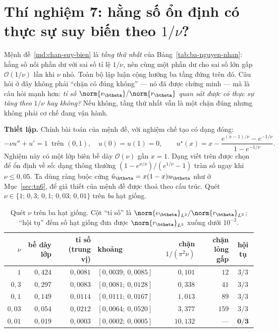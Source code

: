 \section{Thí nghiệm 7: hằng số ổn định có thực sự suy biến theo $1/\nu$?}
\label{sec:tn7}

\begin{thinghiem}
\label{tn:nu}
Mệnh đề~\ref{md:chan-suy-bien} là \emph{tầng thứ nhất} của
Bảng~\ref{tab:ba-nguyen-nhan}: hằng số nối phần dư với sai số tỉ lệ $1/\nu$, nên
cùng một phần dư cho sai số lớn gấp $\mathcal{O}(1/\nu)$ lần khi $\nu$ nhỏ. Toàn
bộ lập luận cộng hưởng ba tầng đứng trên đó. Câu hỏi ở đây không phải ``chặn có
đúng không'' --- nó đã được chứng minh --- mà là câu hỏi mạnh hơn:
\emph{tỉ số $\norm{e_{\btheta}}/\norm{r_{\btheta}}$ quan sát được có thực sự tăng
theo $1/\nu$ hay không?} Nếu không, tầng thứ nhất vẫn là một chặn đúng nhưng
không phải cơ chế đang vận hành.
\end{thinghiem}

\textbf{Thiết lập.} Chính bài toán của mệnh đề, với nghiệm chế tạo có dạng đóng:
\begin{equation}
-\nu u'' + u' = 1 \ \text{ trên } (0,1), \quad u(0)=u(1)=0,
\qquad
u^{\star}(x) = x - \frac{e^{(x-1)/\nu} - e^{-1/\nu}}{1 - e^{-1/\nu}} .
\label{eq:tn7-nghiem}
\end{equation}
Nghiệm này có một lớp biên bề dày $\mathcal{O}(\nu)$ gần $x=1$. Dạng viết trên
được chọn để ổn định về số: dạng thông thường $(1-e^{x/\nu})/(e^{1/\nu}-1)$ tràn
số ngay khi $\nu \le 0{,}05$. Ta dùng ràng buộc cứng
$\hat u_{\btheta} = x(1-x)u_{\btheta}$ như ở Mục~\ref{sec:tn6}, để giả thiết của
mệnh đề được thoả theo cấu trúc. Quét $\nu \in \{1;\,0{,}3;\,0{,}1;\,0{,}03;\,
0{,}01\}$ trên \emph{ba} hạt giống.

\begin{table}[H]
\centering
\caption[Quét $\nu$ cho bài toán đối lưu--khuếch tán]{Quét $\nu$ trên ba hạt
giống. Cột ``tỉ số'' là $\norm{e_{\btheta}}_{L^2}/\norm{r_{\btheta}}_{L^2}$;
``hội tụ'' đếm số hạt giống đưa được $\norm{r_{\btheta}}_{L^2}$ xuống dưới
$10^{-2}$.}
\label{tab:tn7}
\small
\setlength{\tabcolsep}{4pt}
\begin{tabular}{@{}r r r l r r c@{}}
\toprule
$\nu$ & bề dày lớp & tỉ số (trung vị) & khoảng & chặn $1/(\pi^2\nu)$
& chặn lỏng gấp & hội tụ \\
\midrule
$1$      & $0{,}424$ & $0{,}0081$ & $[0{,}0039;\ 0{,}0085]$ & $0{,}101$ & $12$  & $3/3$ \\
$0{,}3$  & $0{,}297$ & $0{,}0083$ & $[0{,}0081;\ 0{,}0128]$ & $0{,}338$ & $41$  & $3/3$ \\
$0{,}1$  & $0{,}149$ & $0{,}0114$ & $[0{,}0111;\ 0{,}0167]$ & $1{,}013$ & $89$  & $3/3$ \\
$0{,}03$ & $0{,}054$ & $0{,}0212$ & $[0{,}0064;\ 0{,}0520]$ & $3{,}377$ & $159$ & $3/3$ \\
$0{,}01$ & $0{,}019$ & $0{,}0003$ & $[0{,}0002;\ 0{,}0005]$ & $10{,}132$& ---   & $\mathbf{0/3}$ \\
\bottomrule
\end{tabular}
\end{table}

